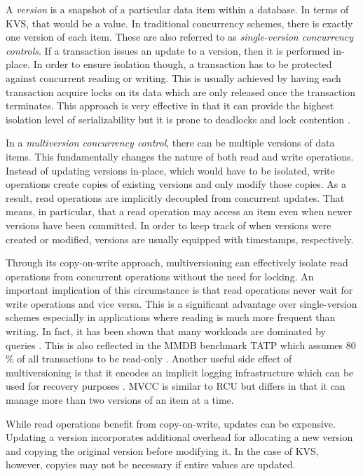 A \emph{version} is a snapshot of a particular data item within a database. In
terms of KVS, that would be a value. In traditional concurrency schemes, there
is exactly one version of each item. These are also referred to as
\emph{single-version concurrency controls}. If a transaction issues an update to
a version, then it is performed in-place. In order to ensure isolation though, a
transaction has to be protected against concurrent reading or writing. This is
usually achieved by having each transaction acquire locks on its data which are
only released once the transaction terminates. This approach is very effective
in that it can provide the highest isolation level of serializability but it is
prone to deadlocks and lock contention \cite{berenson1995critique}.

In a \emph{multiversion concurrency control}, there can be multiple versions of
data items. This fundamentally changes the nature of both read and write
operations. Instead of updating versions in-place, which would have to be
isolated, write operations create copies of existing versions and only modify
those copies. As a result, read operations are implicitly decoupled from
concurrent updates. That means, in particular, that a read operation may access
an item even when newer versions have been committed. In order to keep track of
when versions were created or modified, versions are usually equipped with
timestamps, respectively.

Through its copy-on-write approach, multiversioning can effectively isolate read
operations from concurrent operations without the need for locking. An important
implication of this circumstance is that read operations never wait for write
operations and vice versa. This is a significant advantage over single-version
schemes especially in applications where reading is much more frequent than
writing. In fact, it has been shown that many workloads are dominated by queries
\cite{krueger2011fast, andrei2017sap}. This is also reflected in the MMDB
benchmark TATP which assumes 80 \% of all transactions to be read-only
\cite{larson2011high}. Another useful side effect of multiversioning is that it
encodes an implicit logging infrastructure which can be used for recovery
purposes \cite{condit2009better, venkataraman2011consistent}. MVCC is similar to
RCU \cite{mckenney1998read} but differs in that it can manage more than two
versions of an item at a time.

While read operations benefit from copy-on-write, updates can be expensive.
Updating a version incorporates additional overhead for allocating a new version
and copying the original version before modifying it. In the case of KVS,
however, copyies may not be necessary if entire values are updated.

